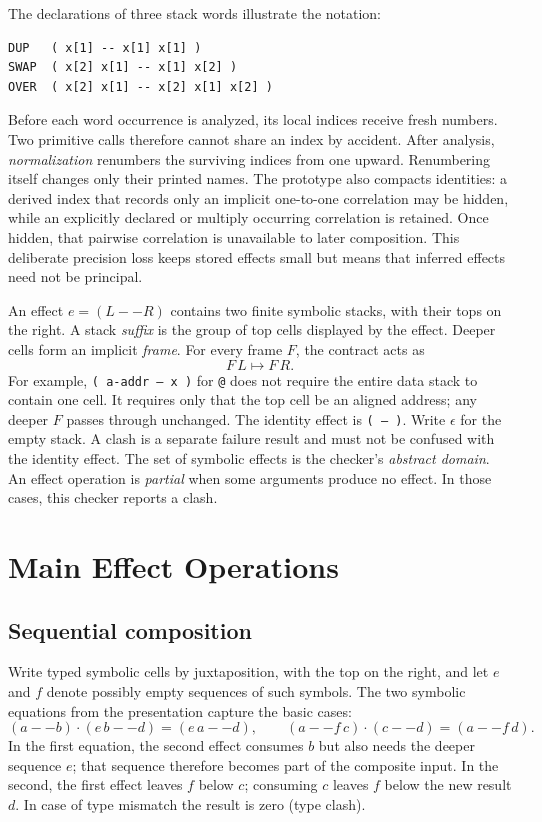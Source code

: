 \documentclass[11pt,a4paper]{article}
\newcommand{\effect}[1]{\mbox{\texttt{#1}}}
\newcommand{\seq}{\mathbin{\cdot}}
\begin{document}
\begin{samepage}
The declarations of three stack words illustrate the notation:
\begin{verbatim}
DUP   ( x[1] -- x[1] x[1] )
SWAP  ( x[2] x[1] -- x[1] x[2] )
OVER  ( x[2] x[1] -- x[2] x[1] x[2] )
\end{verbatim}
Before each word occurrence is analyzed, its local indices receive fresh
numbers.  Two primitive calls therefore cannot share an index by accident.
After analysis, \emph{normalization} renumbers the surviving indices from one
upward.  Renumbering itself changes only their printed names.  The
prototype also compacts identities: a derived index that records only an
implicit one-to-one correlation may be hidden, while an explicitly declared
or multiply occurring correlation is retained.  Once hidden, that pairwise
correlation is unavailable to later composition.  This deliberate precision
loss keeps stored effects small but means that inferred effects need not be
principal.
\end{samepage}

An effect $e=(L--R)$ contains two finite symbolic stacks, with their tops on
the right.  A stack \emph{suffix} is the group of top cells displayed by the
effect.  Deeper cells form an implicit \emph{frame}.  For every frame $F$, the
contract acts as
\[
                  F\,L \longmapsto F\,R.
\]
For example, \effect{( a-addr -- x )} for \texttt{@} does not require the
entire data stack to contain one cell.  It requires only that the top cell be
an aligned address; any deeper $F$ passes through unchanged.  The identity
effect is \effect{( -- )}.  Write $\epsilon$ for the empty stack.  A clash is
a separate failure result and must not be confused with the identity effect.
The set of symbolic effects is the checker's \emph{abstract domain}.  An
effect operation is \emph{partial} when some arguments produce no effect.  In
those cases, this checker reports a clash.

\section{Main Effect Operations}
\label{sec:operations}

\subsection{Sequential composition}

Write typed symbolic cells by juxtaposition, with the top on the right, and
let $e$ and $f$ denote possibly empty sequences of such symbols.  The two
symbolic equations from the presentation capture the basic cases:
\[
 (a -- b)\seq(e\,b -- d)=(e\,a -- d),
 \qquad
 (a -- f\,c)\seq(c -- d)=(a -- f\,d).
\]
In the first equation, the second effect consumes $b$ but also needs the deeper
sequence $e$; that sequence therefore becomes part of the composite input.  In
the second, the first effect leaves $f$ below $c$; consuming $c$ leaves $f$
below the new result $d$.  In case of type mismatch the result is zero (type clash).
\end{document}
